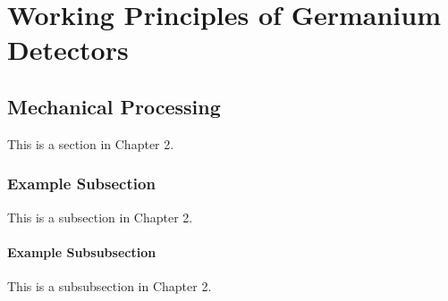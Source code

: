 \chapter{Working Principles of Germanium Detectors}


\section{Mechanical Processing}

This is a section in Chapter 2.


\subsection{Example Subsection}

This is a subsection in Chapter 2.

\subsubsection{Example Subsubsection}

This is a subsubsection in Chapter 2.

